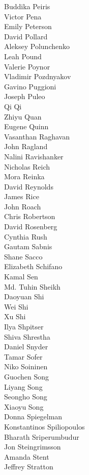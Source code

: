 Buddika Peiris\\
Victor Pena\\
Emily Peterson\\
David Pollard\\
Aleksey Polunchenko\\
Leah Pound\\
Valerie Poynor\\
Vladimir Pozdnyakov\\
Gavino Puggioni\\
Joseph Puleo\\
Qi Qi\\
Zhiyu Quan\\
Eugene Quinn\\
Vasanthan Raghavan\\
John Ragland\\
Nalini Ravishanker\\
Nicholas Reich\\
Mora Reinka\\
David Reynolds\\
James Rice\\
John Roach\\
Chris Robertson\\
David Rosenberg\\
Cynthia Rush\\
Gautam Sabnis\\
Shane Sacco\\
Elizabeth Schifano\\
Kamal Sen\\
Md. Tuhin Sheikh\\
Daoyuan Shi\\
Wei Shi\\
Xu Shi\\
Ilya Shpitser\\
Shiva Shrestha\\
Daniel Snyder\\
Tamar Sofer\\
Niko Soininen\\
Guochen Song\\
Liyang Song\\
Seongho Song\\
Xiaoyu Song\\
Donna Spiegelman\\
Konstantinos Spiliopoulos\\
Bharath Sriperumbudur\\
Jon Steingrimsson\\
Amanda Stent\\
Jeffrey Stratton\\
